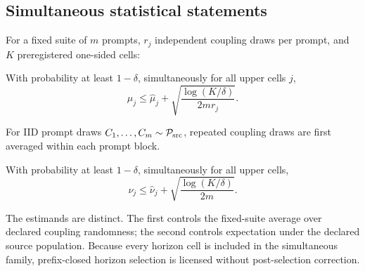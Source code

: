 \subsection{Simultaneous statistical statements}
For a fixed suite of $m$ prompts, $r_j$ independent coupling draws per prompt, and $K$ preregistered one-sided cells:
\begin{theorem}
\label{thm:fixedsuite}
With probability at least $1-\delta$, simultaneously for all upper cells $j$,
\[
\mu_j\le\widehat\mu_j+
\sqrt{\frac{\log(K/\delta)}{2mr_j}}.
\]
\end{theorem}
\proofapp
For IID prompt draws $C_1,\ldots,C_m\sim\mathcal{P}_{\mathrm{src}}$, repeated coupling draws are first averaged within each prompt block.
\begin{theorem}
\label{thm:population}
With probability at least $1-\delta$, simultaneously for all upper cells,
\[
\nu_j\le\widehat\nu_j+
\sqrt{\frac{\log(K/\delta)}{2m}}.
\]
\end{theorem}
\proofapp
The estimands are distinct. The first controls the fixed-suite average over declared coupling randomness; the second controls expectation under the declared source population. Because every horizon cell is included in the simultaneous family, prefix-closed horizon selection is licensed without post-selection correction.
